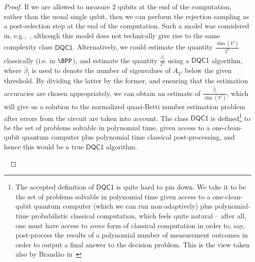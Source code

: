 \documentclass[11pt]{article}
\numberwithin{equation}{section}
\newcommand{\DQC}{\mathsf{DQC1}}
\renewcommand\( {\left(}
\renewcommand\) {\right)}
\begin{document}
\begin{proof}
	If we are allowed to measure 2 qubits at the end of the computation, rather than the usual single qubit, then we can perform the rejection sampling as a post-selection step at the end of the computation. Such a model was considered in, e.g.,~\cite{morimae2014hardness}, although this model does not technically give rise to the same complexity class $\DQC$. Alternatively, we could estimate the quantity $\frac{\dim(V^l)}{2^n}$ classically (i.e. in $\BPP$), and estimate the quantity $\frac{\tilde{\beta_l}}{2^n}$ using a $\DQC$ algorithm, where $\tilde{\beta_l}$ is used to denote the number of eigenvalues of $A_{V^l}$ below the given threshold. By dividing the latter by the former, and ensuring that the estimation accuracies are chosen appropriately, we can obtain an estimate of $\frac{\tilde{\beta_l}}{\dim(V^l)}$, which will give us a solution to the {\sc normalized quasi-Betti number estimation} problem after errors from the circuit are taken into account. The class $\DQC$ is defined\footnote{The accepted definition of $\DQC$ is quite hard to pin down. We take it to be the set of problems solvable in polynomial time given access to a one-clean-qubit quantum computer (which we can run non-adaptively) plus polynomial-time probabilistic classical computation, which feels quite natural -- after all, one must have access to \emph{some} form of classical computation in order to, say, post-process the results of a polynomial number of measurement outcomes in order to output a final answer to the decision problem. This is the view taken also by Brand\~ao in~\cite{brandao_thesis}} to be the set of problems solvable in polynomial time, given access to a one-clean-qubit quantum computer plus polynomial time classical post-processing, and hence this would be a true $\DQC$ algorithm. 

\


\end{proof}
\end{document}
